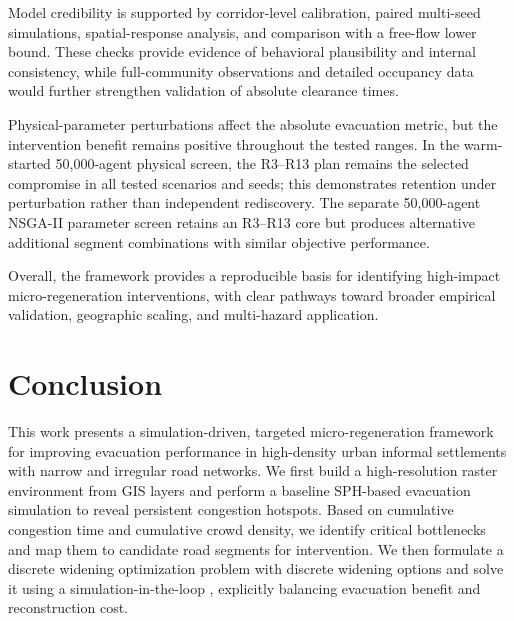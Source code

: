 \documentclass[preprint,12pt]{elsarticle}
\newcommand{\revb}[1]{{\color{blue}{#1}}}
\begin{document}
{Model credibility is supported by corridor-level calibration, paired multi-seed simulations, spatial-response analysis, and comparison with a free-flow lower bound. These checks provide evidence of behavioral plausibility and internal consistency, while full-community observations and detailed occupancy data would further strengthen validation of absolute clearance times.

Physical-parameter perturbations affect the absolute evacuation metric, but the intervention benefit remains positive throughout the tested ranges. In the warm-started 50,000-agent physical screen, the R3--R13 plan remains the selected compromise in all tested scenarios and seeds; this demonstrates retention under perturbation rather than independent rediscovery. The separate 50,000-agent NSGA-II parameter screen retains an R3--R13 core but produces alternative additional segment combinations with similar objective performance.

Overall, the framework provides a reproducible basis for identifying high-impact micro-regeneration interventions, with clear pathways toward broader empirical validation, geographic scaling, and multi-hazard application.
}

\section{Conclusion}
\label{sec:conclusion}

This work presents a simulation-driven, targeted micro-regeneration framework for improving evacuation performance in
high-density urban informal settlements with narrow and irregular road networks. We first build a high-resolution raster environment
from GIS layers and perform a baseline SPH-based evacuation simulation to reveal persistent congestion hotspots. Based on
cumulative congestion time and cumulative crowd density, we identify critical bottlenecks and map them to candidate
road segments for intervention. We then formulate a discrete widening optimization problem with discrete widening options and solve it using a simulation-in-the-loop \revb{multi-objective NSGA-II}, explicitly balancing evacuation benefit and reconstruction cost.
\end{document}
